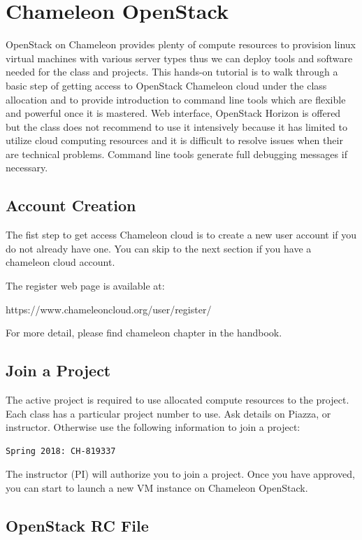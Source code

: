 \section{Chameleon OpenStack}
\label{chameleon-openstack}

OpenStack on Chameleon provides plenty of compute resources to provision linux
virtual machines with various server types thus we can deploy tools and
software needed for the class and projects. This hands-on tutorial is to walk
through a basic step of getting access to OpenStack Chameleon cloud under the
class allocation and to provide introduction to command line tools which are
flexible and powerful once it is mastered. Web interface, OpenStack Horizon is
offered but the class does not recommend to use it intensively because it has
limited to utilize cloud computing resources and it is difficult to resolve
issues when their are technical problems. Command line tools generate full
debugging messages if necessary.

\subsection{Account Creation}
The fist step to get access Chameleon cloud is to create a new user account if
you do not already have one. You can skip to the next section if you have a
chameleon cloud account.

The register web page is available at:

https://www.chameleoncloud.org/user/register/

For more detail, please find chameleon chapter in the handbook.

\subsection{Join a Project}
The active project is required to use allocated compute resources to the project.
Each class has a particular project number to use. Ask details on Piazza, or
instructor. Otherwise use the following information to join a project:

\begin{lstlisting}
Spring 2018: CH-819337
\end{lstlisting}

The instructor (PI) will authorize you to join a project. Once you have
approved, you can start to launch a new VM instance on Chameleon OpenStack.

\subsection{OpenStack RC File}

